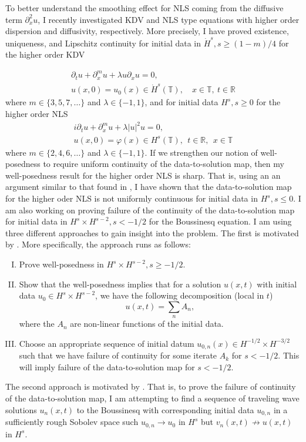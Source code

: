 \documentclass[12pt,reqno]{amsart}
\newcommand{\rr}{\mathbb{R}}
\newcommand{\ci}{\mathbb{T}}
\newcommand{\p}{\partial}
\newcommand{\vp}{\varphi}
\begin{document}
To better understand the smoothing effect for NLS coming from the diffusive term
$\p_{x}^{2}u$, I
recently investigated KDV and NLS type equations with higher order
dispersion and diffusivity, respectively. More precisely, I have proved
existence, uniqueness, and Lipschitz continuity for initial data in
$\dot{H}^{s}, s \ge (1-m)/4$ for the higher order KDV

\begin{gather}
	\label{mmKDV-eq}
	\p_t u + \p_x^{m} u + \lambda u \p_x u = 0,
	\\
	\label{mmKDV-init-data}
  u(x,0) = u_0(x) \in \dot{H}^{s}(\ci), \quad x \in \ci, \ t \in \rr
\end{gather}
%
%
where $m \in \{3, 5, 7,\dots \}$ and $\lambda \in \{-1, 1\}$, 
%
and for initial data $H^{s}, s \ge 0$ for the higher order NLS
%
%
\begin{gather}
	\label{nmNLS-eq}
	i \p_t u + \p_x^{m} u + \lambda |u|^2 u =0,
		\\
		\label{nmNLS-init-data}
		u(x,0) = \vp(x) \in H^s(\ci), \ \ t \in \rr, \ \ x \in \ci
\end{gather}
%
%
where $m \in \{2,4,6,\dots\}$ and $\lambda \in \{-1, 1\}$. If we strengthen our
notion of well-posedness to require uniform continuity of the data-to-solution
map, then my well-posedness result for the higher order NLS is sharp. That is,
using an an argument
similar to that found in \cite{Burq_Gerad_Tzvetkov-An-instability-}, I have
shown that the data-to-solution map for the higher oder NLS is not uniformly
continuous for initial data in $H^{s}, s \le 0$. 
%
%
%
I am also working on proving failure of the continuity of the data-to-solution map for
initial data in $H^{s} \times H^{s-2}, s < -1/2$ for the Boussinesq equation. I am using three
different approaches to gain insight into the problem. The first is motivated by
\cite{Bejenaru-Tao-2006-Sharp-well-posedness-and-ill-posedness}. More
specifically, the approach runs as follows:
\begin{enumerate}[I.]
  \item
    Prove well-posedness in $H^{s} \times H^{s-2}, s \ge -1/2$.
 \item
   Show that the well-posedness implies that for a solution $u(x,t)$ with
   initial data $u_{0} \in H^{s} \times H^{s-2}$, we have the following
   decomposition (local in $t$) 
   $$u(x,t) = \sum_{n} A_{n},$$ where the $A_{n}$ are non-linear functions of
   the initial data. 
 \item 
   Choose an appropriate sequence of initial datum $u_{0,n}(x) \in H^{-1/2}
   \times H^{-3/2}$ such that
   we have failure of continuity for some iterate $A_{k}$ for $s < -1/2$.
   This will imply
   failure of the data-to-solution map for $s < -1/2$.
   \end{enumerate}
%
The second approach is motivated by \cite{Himonas:2005kx}. That is,
to prove the failure of continuity of the data-to-solution map, I am attempting
to find a sequence of traveling wave solutions $u_{n}(x,t)$ to the Boussinesq with
corresponding initial data $u_{0,n}$ in a sufficiently rough Sobolev space such 
$u_{0,n} \to u_{0}$ in $H^{s}$ but $v_{n}(x,t) \not \to u(x,t)$ in $H^{s}$. 
\end{document}
